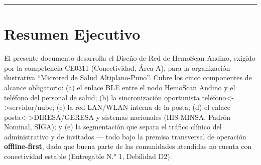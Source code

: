 \documentclass[11pt,a4paper]{article}
\begin{document}
\begin{center}\rule{0.5\linewidth}{0.5pt}\end{center}

\section{Resumen Ejecutivo}\label{resumen-ejecutivo}

El presente documento desarrolla el Diseño de Red de HemoScan Andino, exigido por la competencia CE0311 (Conectividad, Área A), para la organización ilustrativa ``Microred de Salud Altiplano-Puno''. Cubre los cinco componentes de alcance obligatorio: (a) el enlace BLE entre el nodo HemoScan Andino y el teléfono del personal de salud; (b) la sincronización oportunista teléfono\textless-\textgreater servidor/nube; (c) la red LAN/WLAN interna de la posta; (d) el enlace posta\textless-\textgreater DIRESA/GERESA y sistemas nacionales (HIS-MINSA, Padrón Nominal, SIGA); y (e) la segmentación que separa el tráfico clínico del administrativo y de invitados --- todo bajo la premisa transversal de operación \textbf{offline-first}, dado que buena parte de las comunidades atendidas no cuenta con conectividad estable (Entregable N.° 1, Debilidad D2).
\end{document}
